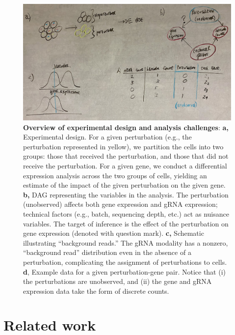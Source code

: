 \documentclass[12pt]{article}
\begin{document}
\begin{figure}[h!]
	\centering
	\includegraphics[width=0.9\linewidth]{analysis_challenges}
	\caption{\textbf{Overview of experimental design and analysis challenges}: \textbf{a,} Experimental design. For a given perturbation (e.g., the perturbation represented in yellow), we partition the cells into two groups: those that received the perturbation, and those that did not receive the perturbation. For a given gene, we conduct a differential expression analysis across the two groups of cells, yielding an estimate of the impact of the given perturbation on the given gene. \textbf{b,} DAG representing the variables in the analysis. The perturbation (unobserved) affects both gene expression and gRNA expression; technical factors (e.g., batch, sequencing depth, etc.) act as nuisance variables. The target of inference is the effect of the perturbation on gene expression (denoted with question mark). \textbf{c,} Schematic illustrating ``background reads.'' The gRNA modality has a nonzero, ``background read'' distribution even in the absence of a perturbation, complicating the assignment of perturbations to cells. \textbf{d}, Example data for a given perturbation-gene pair. Notice that (i) the perturbations are unobserved, and (ii) the gene and gRNA expression data take the form of discrete counts.}
	\label{analysis_challenges}
\end{figure}

\section{Related work}
\end{document}
